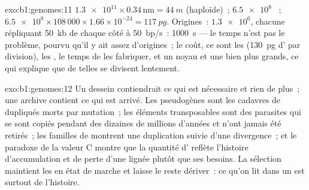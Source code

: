 \begin{solution}{exo:b1:genomes:11}
$\num{1.3e11}\times 0.34\,\mathrm{nm} = \qty{44}{m}$ (haploïde)~;
$\num{6.5e8}$ ~;  $\num{6.5e8}\times 108\,000\times
1.66\times 10^{-24} = \qty{117}{pg}$. Origines~: $\num{1.3e6}$, chacune
répliquant \qty{50}{kb} de chaque côté à \qty{50}{bp/s}~: \qty{1000}{s}
--- le temps n'est pas le problème, pourvu qu'il y ait assez
d'origines~; le coût, ce sont les  (\qty{130}{pg} d' par
division), les , le temps de les fabriquer, et un noyau et une
 bien plus grands, ce qui explique que de telles  se
divisent lentement.
\end{solution}

\begin{solution}{exo:b1:genomes:12}
Un dessein contiendrait ce qui est nécessaire et rien de plus~; une
archive contient ce qui est arrivé. Les pseudogènes sont les cadavres de
 dupliqués morts par mutation~; les éléments transposables sont des
parasites qui se sont copiés pendant des dizaines de millions d'années
et n'ont jamais été retirés~; les familles de  montrent une
duplication suivie d'une divergence~; et le paradoxe de la valeur C
montre que la quantité d' reflète l'histoire d'accumulation et de
perte d'une lignée plutôt que ses besoins. La sélection maintient les
 en état de marche et laisse le reste dériver~: ce qu'on lit dans
un  est surtout de l'histoire.
\end{solution}

